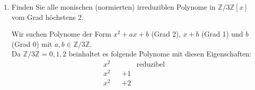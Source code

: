 \documentclass{article} %
\begin{document}
\begin{enumerate}
    
    \begin{mybox}
    Leitkoeffizient von $r(x): 1$ \\
    Leitkoeffizient von $g(x): 1$ \\
    \[
    \frac{1}{1} \mod 5 = 1 \mod 5 = 1
    \]
    Gradunterschied: 1
    \[
    t(x)_3 = x
    \]
    \[
    q(x) = x^3 + 4x^2 + x
    \]
    \begin{align*}
        r(x) & = (x^3 - x^2 + 4x + 2) - (x \cdot (x^2 + 2x + 3)) \mod 5 \\
        r(x) & = (x^3 - x^2 + 4x + 2) - (x^3 + 2x^2 + 3x) \mod 5 \\
        r(x) & = ( - 3x^2 + x + 2) \mod 5 \\
        r(x) & = 2x^2 + x + 2
    \end{align*}
   \sout{ Lösung: 
    $q(x) = x^3 + 4x^2 + x$ mit  
    $r(x)  = ( - 3x^2 + x + 2) $} Da muss man noch einen Schrott weiter, damit der Rest einen Grad kleiner hat als $g(x)$
    \hrule 
    Leitkoeffizient von $r(x): 2$ \\
    Leitkoeffizient von $g(x): 1$ \\
    \[
    \frac{2}{1} \mod 5 = 2 \mod 5 = 2
    \]
    Gradunterschied: -1
    \[
    t(x)_4 = 2
    \]
    \[
    q(x) = x^3 + 4x^2 + x + 2
    \]
    \begin{align*}
        r(x) & = (2x^2 + x + 2) - (2 \cdot (x^2 + 2x + 3)) \mod 5 \\
       r(x) & = (2x^2 + x + 2) - (2x^2 + 4x + 6) \mod 5 \\
       r(x) & = (-3x -4) \mod 5 \\
       r(x) & = 2x + 1
    \end{align*}
    Lösung: 
    $q(x) = x^3 + 4x^2 + x + 2$ mit  
    $r(x)  = 2x + 1 $
    \end{mybox}
        \item Finden Sie alle monischen (normierten) irreduziblen Polynome in \( \mathbb{Z}/3\mathbb{Z}[x] \) vom Grad höchstens 2.
        \begin{mybox}
        Wir suchen Polynome der Form $x^2+ax+b$ (Grad 2), $x+b$ (Grad 1) und $b$ (Grad 0) mit $a,b \in \mathbb{Z}/3\mathbb{Z}$. \\
        Da $\mathbb{Z}/3\mathbb{Z} = {0,1,2}$ beinhaltet es folgende Polynome mit diesen Eigenschaften: 
       \[
       \begin{array}{cccc}
        x^2 &  & & \text{reduzibel}\\
        x^2 &  & + 1 \\ 
        x^2 &  & + 2 \\

\end{array}\]
\end{mybox}
\end{enumerate}
\end{document}
